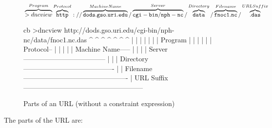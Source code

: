 \begin{figure}[h]
\texorhtml
{\small
${}\overbrace{>dncview}^{Program} 
\overbrace{\tt http}^{Protocol}://
\overbrace{\tt dods.gso.uri.edu}^{Machine Name}/
\overbrace{\tt cgi-bin/nph-nc}^{Server}/
\overbrace{\tt data}^{Directory}/
\overbrace{\tt fnoc1.nc}^{Filename}/
\overbrace{\tt .das}^{URL Suffix}$}
{\begin{vcode}{cb}
>dncview http://dods.gso.uri.edu/cgi-bin/nph-nc/data/fnoc1.nc.das
   ^     ^      ^                        ^      ^    ^        ^
   |     |      |                        |      |    |        |
Program  |      |                        |      |    |        |
Protocol--      |                        |      |    |        |
Machine Name-----                        |      |    |        |
Server------------------------------------      |    |        |
Directory----------------------------------------    |        |
Filename----------------------------------------------        |
URL Suffix-----------------------------------------------------
\end{vcode}}
\caption{Parts of an \opendap URL (without a constraint expression)}
\label{opd-client,fig,url-parts}
\end{figure}

The parts of the URL are:

